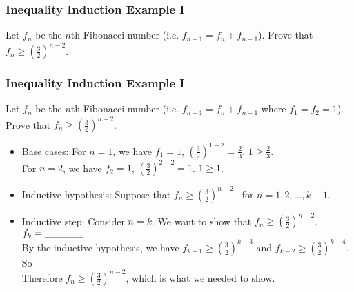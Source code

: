 \documentclass{beamer}
\newcommand{\blank}{\underbar{\hphantom{aaaaaaaa}}}
\begin{document}
\begin{frame}[t]
  \frametitle{Inequality Induction Example I}
  Let $f_n$ be the $n$th Fibonacci number (i.e. $f_{n+1} = f_n + f_{n-1}$). Prove that $f_n \geq (\frac{3}{2})^{n-2}$.

\end{frame}

\begin{frame}[t]
  \frametitle{Inequality Induction Example I}
  Let $f_n$ be the $n$th Fibonacci number (i.e. $f_{n+1} = f_n + f_{n-1}$ where $f_1 = f_2 = 1$). Prove that $f_n \geq (\frac{3}{2})^{n-2}$.
  \begin{itemize}
    \item Base cases: For $n=1$, we have $f_1 = 1$, $\left(\frac{3}{2}\right)^{1-2} = \frac{2}{3}$. $1 \geq \frac{2}{3}$. \\
    For $n=2$, we have $f_2 = 1$, $\left(\frac{3}{2}\right)^{2-2} = 1$. $1 \geq 1$.
    \\
    \item Inductive hypothesis: Suppose that $f_n \geq \left(\frac{3}{2}\right)^{n-2}$ \ for $n = 1, 2, \ldots, k - 1$. 
    \item Inductive step: Consider $n=k$. We want to show that $f_n \geq (\frac{3}{2})^{n-2}$. \\
    $f_{k} = \blank$ \\
    By the inductive hypothesis, we have $f_{k-1} \geq \left(\frac{3}{2}\right)^{k-3}$ and $f_{k-2} \geq \left(\frac{3}{2}\right)^{k-4}$. \\
    So \blank \\
    Therefore $f_n \geq \left(\frac{3}{2}\right)^{n-2}$, which is what we needed to show.
    
    
  \end{itemize}
\end{frame}
\end{document}
